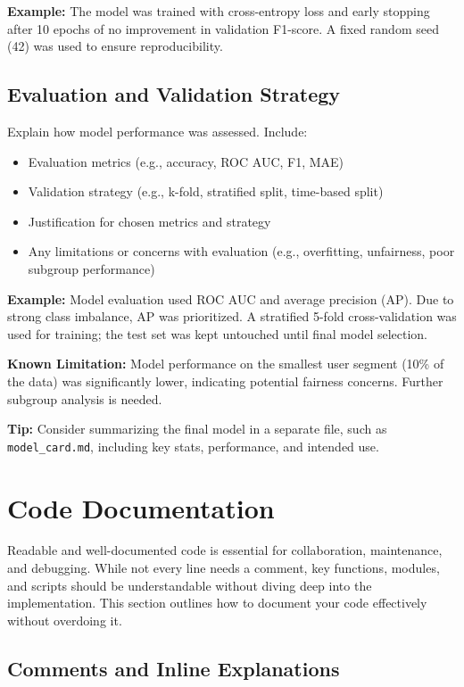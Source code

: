 \documentclass[12pt,openany]{book}
\begin{document}
\textbf{Example:} The model was trained with cross-entropy loss and early stopping after 10 epochs of no improvement in validation F1-score. A fixed random seed (42) was used to ensure reproducibility.

\subsection{Evaluation and Validation Strategy}

Explain how model performance was assessed. Include:
\begin{itemize}
    \item Evaluation metrics (e.g., accuracy, ROC AUC, F1, MAE)
    \item Validation strategy (e.g., k-fold, stratified split, time-based split)
    \item Justification for chosen metrics and strategy
    \item Any limitations or concerns with evaluation (e.g., overfitting, unfairness, poor subgroup performance)
\end{itemize}

\textbf{Example:} Model evaluation used ROC AUC and average precision (AP). Due to strong class imbalance, AP was prioritized. A stratified 5-fold cross-validation was used for training; the test set was kept untouched until final model selection.

\textbf{Known Limitation:} Model performance on the smallest user segment (10\% of the data) was significantly lower, indicating potential fairness concerns. Further subgroup analysis is needed.

\textbf{Tip:} Consider summarizing the final model in a separate file, such as \texttt{model\_card.md}, including key stats, performance, and intended use.



\section{Code Documentation}

Readable and well-documented code is essential for collaboration, maintenance, and debugging. While not every line needs a comment, key functions, modules, and scripts should be understandable without diving deep into the implementation. This section outlines how to document your code effectively without overdoing it.

\subsection{Comments and Inline Explanations}
\end{document}

